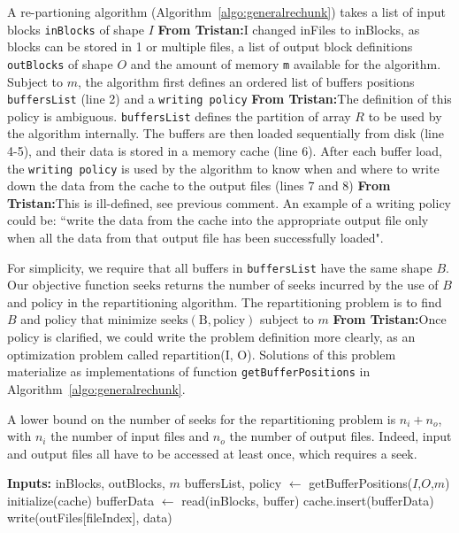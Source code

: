 \documentclass[conference]{IEEEtran}
\newcommand{\tristan}[1]{\color{orange}\textbf{From Tristan:}#1\color{black}}
\begin{document}
A re-partioning algorithm (Algorithm~\ref{algo:generalrechunk}) takes a
list of input blocks \texttt{inBlocks} of shape $I$ \tristan{I changed inFiles to inBlocks, as blocks can be stored in 1 or multiple files}, a list of output block definitions
\texttt{outBlocks} of shape $O$ and the amount of memory \texttt{m}
available for the algorithm. Subject to $m$, the algorithm first defines an ordered list of buffers positions
\texttt{buffersList} (line 2) and a \texttt{writing policy} \tristan{The definition of this policy is ambiguous}. 
\texttt{buffersList} defines the partition of array $R$ to be used by the algorithm internally.
The buffers are then loaded sequentially from disk
(line 4-5), and their data is stored in a memory cache (line 6). After each buffer load,
the \texttt{writing policy} is used by the algorithm to know when and where to
write down the data from the cache to the output files (lines 7 and 8) \tristan{This is ill-defined, see previous comment}. An
example of a writing policy could be:
``write the data from the cache into the appropriate output file only when all
the data from that output file has been successfully loaded".

For simplicity, we require that all buffers in \texttt{buffersList} have
the same shape $B$. Our objective function
$\mathrm{seeks}$ returns the number of seeks incurred by the use of
$B$ and $\mathrm{policy}$ in the repartitioning algorithm. The
repartitioning problem is to find $B$ and $\mathrm{policy}$ that minimize
$\mathrm{seeks(B, policy)}$ subject to $m$ \tristan{Once policy is
clarified, we could write the problem definition more clearly, as an
optimization problem called repartition(I, O)}. Solutions of this problem materialize as
implementations of function \texttt{getBufferPositions} in
Algorithm~\ref{algo:generalrechunk}.

A lower bound on the number of seeks for the repartitioning problem is
$n_i + n_o$, with $n_i$ the number of input files and $n_o$ the number of output
files. Indeed, input and output files all have to be accessed at least once,
which requires a seek.

\begin{algorithm}
  \caption{General re-partitioning algorithm \tristan{some notations are still undefined, for instance I and O. Moreover, inputs and outputs should be defined with a line 
  of text, as in Algorithm 1 of \url{https://github.com/big-data-lab-team/paper-multidimensional-ltc/releases/download/0.1/paper.pdf}.}}
  \label{algo:generalrechunk}
  \begin{algorithmic}[1]
    \STATE \textbf{Inputs:} inBlocks, outBlocks, $m$
    \STATE buffersList, policy $\leftarrow$ getBufferPositions($I$,$O$,$m$)
    \STATE initialize(cache)
      \STATE bufferData $\leftarrow$ read(inBlocks, buffer)
      \STATE cache.insert(bufferData)
        \STATE write(outFiles[fileIndex], data)
      \ENDFOR
    \ENDFOR

  \end{algorithmic}
\end{algorithm}
\end{document}
